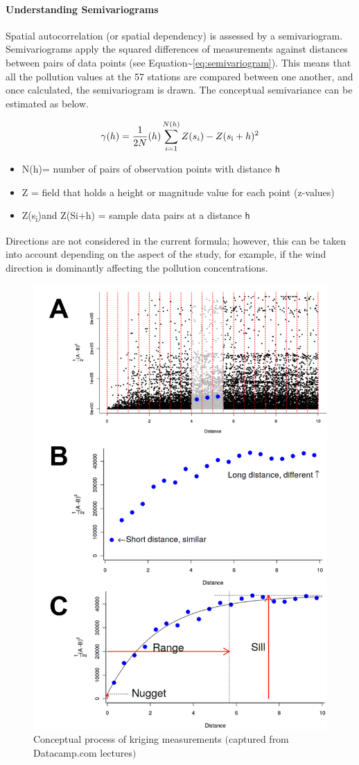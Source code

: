 \hypertarget{understanding-semivariograms}{%
\paragraph{Understanding
Semivariograms}\label{understanding-semivariograms}}

Spatial autocorrelation (or spatial dependency) is assessed by a
semivariogram. Semivariograms apply the squared differences of
measurements against distances between pairs of data points (see
Equation\textasciitilde{}\ref{eq:semivariogram}). This means that all
the pollution values at the 57 stations are compared between one
another, and once calculated, the semivariogram is drawn. The conceptual
semivariance can be estimated as below.

\begin{equation}
\label{eq:semivariogram}
\gamma(h)= \frac{1}{2N}(h) \sum_{i=1}^{N(h)}{Z(s_i) - Z(s\textsubscript{i} + h)\textsuperscript{2}}
\end{equation}

\begin{itemize}
 \setlength\itemsep{0em}
    \item N(h)= number of pairs of observation points with distance \texttt{h}
    \item Z = field that holds a height or magnitude value for each point (z-values)
    \item Z(s\textsubscript{i})and Z(Si+h) = sample data pairs at a distance \texttt{h} \citep{Luo2008}
\end{itemize}

Directions are not considered in the current formula; however, this can
be taken into account depending on the aspect of the study, for example,
if the wind direction is dominantly affecting the pollution
concentrations.

\begin{figure}[hbt!]
\begin{center} 
  \includegraphics[width=.5\textwidth]{Figures/semivariogram.png}
\end{center} 
\caption{Conceptual process of kriging measurements $($captured from Datacamp.com lectures$)$} 
\label{fig:semivariogram} 
\end{figure}

